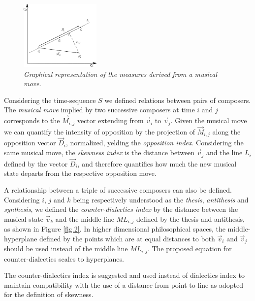 \documentclass[
 aip,
 jmp,
 amsmath,amssymb,
 reprint,
]{revtex4-1}
\begin{document}
\begin{figure}
        \begin{center}
                \includegraphics[width=0.35\textwidth]{phil-space-desc_}
        \end{center}
        \caption{\it Graphical representation of the measures derived from a \emph{musical move}.}
        \label{fig.1}
\end{figure}

Considering the time-sequence $S$ we defined relations between pairs of composers. The \emph{musical move} implied by two successive composers at time $i$ and $j$ corresponds to the $\vec{M}_{i,j}$ vector extending from $\vec{v}_i$ to $\vec{v}_j$. Given the musical move we can quantify the intensity of opposition by the projection of $\vec{M}_{i,j}$ along the opposition vector $\vec{D}_i$, normalized, yelding the \emph{opposition index}. Considering the same musical move, the \emph{skewness index} is the distance between $\vec{v}_j$ and the line $L_i$ defined by the vector $\vec{D}_i$, and therefore quantifies how much the new
musical state departs from the respective opposition move.

A relationship between a triple of successive composers can also be defined. Considering $i$, $j$ and $k$ being respectively understood as the \emph{thesis}, \emph{antithesis} and \emph{synthesis}, we defined the \emph{counter-dialectics index} by the distance between the musical state $\vec{v}_k$ and the middle line $ML_{i,j}$ defined by the thesis and antithesis, as shown in Figure \ref{fig.2}. In higher dimensional philosophical spaces,
the middle-hyperplane defined by the points which are at equal
distances to both $\vec{v}_i$ and $\vec{v}_j$ should be used instead
of the middle line $ML_{i,j}$. The proposed equation for counter-dialectics scales to hyperplanes.

The counter-dialectics index is suggested and used instead of dialectics index to maintain compatibility with the use of a distance from point to line as adopted for the definition of skewness.
\end{document}
